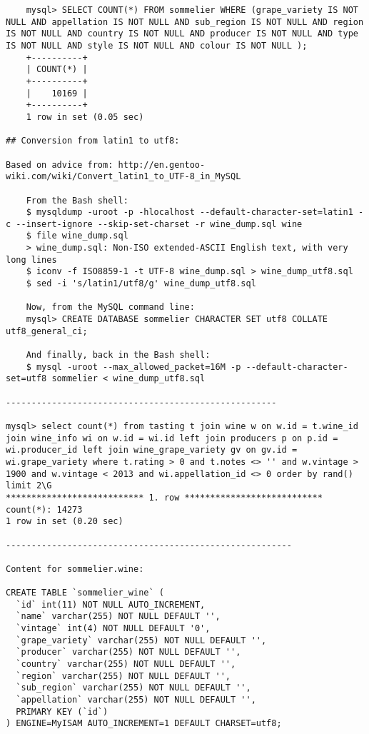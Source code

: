 \begin{verbatim}
    mysql> SELECT COUNT(*) FROM sommelier WHERE (grape_variety IS NOT NULL AND appellation IS NOT NULL AND sub_region IS NOT NULL AND region IS NOT NULL AND country IS NOT NULL AND producer IS NOT NULL AND type IS NOT NULL AND style IS NOT NULL AND colour IS NOT NULL );
    +----------+
    | COUNT(*) |
    +----------+
    |    10169 |
    +----------+
    1 row in set (0.05 sec)

## Conversion from latin1 to utf8:

Based on advice from: http://en.gentoo-wiki.com/wiki/Convert_latin1_to_UTF-8_in_MySQL

    From the Bash shell:
    $ mysqldump -uroot -p -hlocalhost --default-character-set=latin1 -c --insert-ignore --skip-set-charset -r wine_dump.sql wine
    $ file wine_dump.sql
    > wine_dump.sql: Non-ISO extended-ASCII English text, with very long lines
    $ iconv -f ISO8859-1 -t UTF-8 wine_dump.sql > wine_dump_utf8.sql
    $ sed -i 's/latin1/utf8/g' wine_dump_utf8.sql

    Now, from the MySQL command line:
    mysql> CREATE DATABASE sommelier CHARACTER SET utf8 COLLATE utf8_general_ci;

    And finally, back in the Bash shell:
    $ mysql -uroot --max_allowed_packet=16M -p --default-character-set=utf8 sommelier < wine_dump_utf8.sql

-----------------------------------------------------

mysql> select count(*) from tasting t join wine w on w.id = t.wine_id join wine_info wi on w.id = wi.id left join producers p on p.id = wi.producer_id left join wine_grape_variety gv on gv.id = wi.grape_variety where t.rating > 0 and t.notes <> '' and w.vintage > 1900 and w.vintage < 2013 and wi.appellation_id <> 0 order by rand() limit 2\G
*************************** 1. row ***************************
count(*): 14273
1 row in set (0.20 sec)

--------------------------------------------------------

Content for sommelier.wine:

CREATE TABLE `sommelier_wine` (
  `id` int(11) NOT NULL AUTO_INCREMENT,
  `name` varchar(255) NOT NULL DEFAULT '',
  `vintage` int(4) NOT NULL DEFAULT '0',
  `grape_variety` varchar(255) NOT NULL DEFAULT '',
  `producer` varchar(255) NOT NULL DEFAULT '',
  `country` varchar(255) NOT NULL DEFAULT '',
  `region` varchar(255) NOT NULL DEFAULT '',
  `sub_region` varchar(255) NOT NULL DEFAULT '',
  `appellation` varchar(255) NOT NULL DEFAULT '',
  PRIMARY KEY (`id`)
) ENGINE=MyISAM AUTO_INCREMENT=1 DEFAULT CHARSET=utf8;


\end{verbatim}
